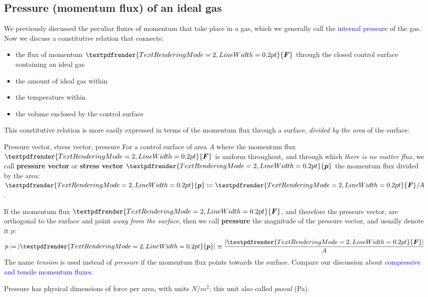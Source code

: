 \documentclass[a4paper,12pt,%
onecolumn,oneside,%
british%
]{memoir}
\renewcommand*{\bm}[1]{\textpdfrender{TextRenderingMode=2,LineWidth=0.2pt}{\boldsymbol{#1}}}
\newcommand*{\defd}{\coloneqq}
\DeclarePairedDelimiter\abs{\lvert}{\rvert}
\renewcommand*{\|}[1][]{\nonscript\:#1\vert\nonscript\:\mathopen{}}
\newcommand*{\sect}{\S}%
\renewcommand*{\autoref}[2]{\sidepar{\vspace{-1ex}\footnotesize{\color{blue}\faIcon{%
angle-right%
}\enskip\sect~\ref{#1} page~\pageref{#1}}}\textcolor{blue}{#2}}
\newcommand*{\yF}{\bm{F}}
\newcommand*{\ypr}{p} %
\newcommand*{\ypv}{\bm{\ypr}} %
\begin{document}

\subsection{Pressure (momentum flux) of an ideal gas}
\label{sec:pressure_ideal_gas}

We previously discussed the peculiar fluxes of momentum that take place in a gas, which we generally call the \autoref{def:internal_pressure}{internal pressure} of the gas. Now we discuss a constitutive relation that connects:
\begin{itemize}[nosep]
\item the flux of momentum $\yF$ through the closed control surface containing an ideal gas
\item the amount of ideal gas within
\item the temperature within
\item the volume enclosed by the control surface
\end{itemize}

This constitutive relation is more easily expressed in terms of the momentum flux through a surface, \emph{divided by the area} of the surface:
\begin{definition}{{Pressure vector, stress vector, pressure}}
  For a control surface of area $A$ where the momentum flux $\yF$ is uniform throughout, and through which \emph{there is no matter flux}, we call \textbf{pressure vector} or \textbf{stress vector} $\ypv$ the momentum flux divided by the area: $\ypv \defd \yF/A$.

  \medskip

If the momentum flux $\yF$, and therefore the pressure vector, are orthogonal to the surface and point \emph{away from the surface}, then we call \textbf{pressure} the magnitude of the pressure vector, and usually denote it $\ypr$:
\begin{equation}
  \label{eq:pressure_def}
  \ypr \defd \abs{\ypv} \equiv \frac{\abs{\yF}}{A}
\end{equation}
The name \emph{tension} is used instead of \emph{pressure} if the momentum flux points towards the surface. Compare our discussion about \autoref{sec:pressure_tension_shear}{compressive and tensile momentum fluxes}.

\medskip

Pressure has physical dimensions of force per area, with units $\unit{N/m^{2}}$; this unit also called \emph{pascal} (\unit{Pa}).
\end{definition}
\end{document}
